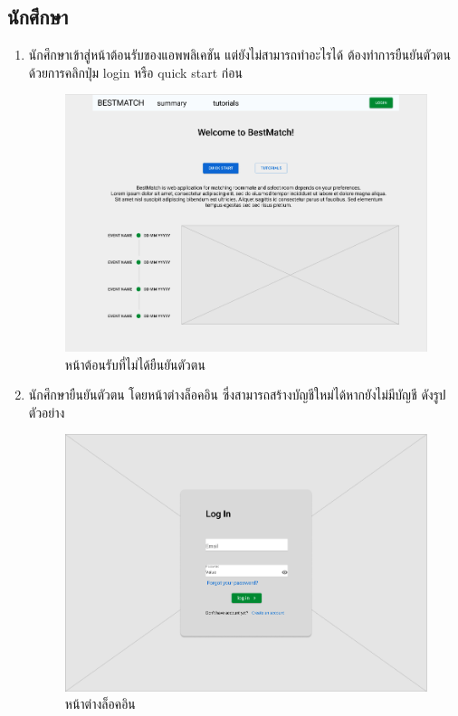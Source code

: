 \subsection{นักศึกษา}
\begin{enumerate}
  \item นักศึกษาเข้าสู่หน้าต้อนรับของแอพพลิเคชัน แต่ยังไม่สามารถทำอะไรได้ ต้องทำการยืนยันตัวตนด้วยการคลิกปุ่ม login หรือ quick start ก่อน
        \begin{figure}[h]
          \begin{center}
            \includegraphics[width=\linewidth]{photo/student/home.png}
          \end{center}
          \caption{หน้าต้อนรับที่ไม่ได้ยืนยันตัวตน}
          \label{fig:homepage}
        \end{figure}
        \clearpage
  \item นักศึกษายืนยันตัวตน โดยหน้าต่างล็อคอิน ซึ่งสามารถสร้างบัญชีใหม่ได้หากยังไม่มีบัญชี ดังรูปตัวอย่าง
        \begin{figure}[h]
          \begin{center}
            \includegraphics[width=\linewidth]{photo/student/login.png}
          \end{center}
          \caption{หน้าต่างล็อคอิน}
          \label{fig:login}
        \end{figure}
        

\end{enumerate}
